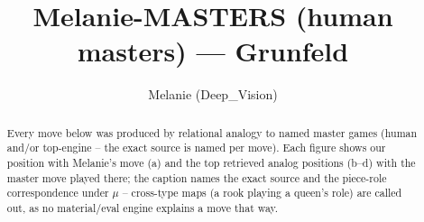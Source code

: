 \documentclass[11pt]{article}
\title{Melanie-MASTERS (human masters) — Grunfeld}
\author{Melanie (Deep\_Vision)}
\date{}
\begin{document}
\maketitle

\begin{abstract}Every move below was produced by relational analogy to named master games (human and/or top-engine -- the exact source is named per move). Each figure shows our position with Melanie's move (a) and the top retrieved analog positions (b--d) with the master move played there; the caption names the exact source and the piece-role correspondence under $\mu$ -- cross-type maps (a rook playing a queen's role) are called out, as no material/eval engine explains a move that way.\end{abstract}

\begin{figure}[p]\centering
\begin{subfigure}{0.46\textwidth}\centering
\resizebox{\linewidth}{!}{%
\newchessgame
\chessboard[
  setfen={rnbqk2r/ppp1ppbp/6p1/8/2BPP3/2P5/P4PPP/R1BQK1NR b KQkq - 2 7},
  showmover=false,
  pgfstyle=straightmove, color=movearrow, markmove={g7-f6}
]}
\caption{}
\end{subfigure}\hfill
\begin{subfigure}{0.46\textwidth}\centering
\resizebox{\linewidth}{!}{%
\newchessgame
\chessboard[
  setfen={r1bqk2r/pp3ppp/8/2bpP3/2p5/8/PPP1BPPP/R1BQ1RK1 w kq - 1 12},
  showmover=false,
  pgfstyle=straightmove, color=movearrow, markmove={e2-f3}
]}
\caption{}
\end{subfigure}
\\[4pt]
\begin{subfigure}{0.46\textwidth}\centering
\resizebox{\linewidth}{!}{%
\newchessgame
\chessboard[
  setfen={r2qk2r/pppn1pp1/2p3p1/2b5/4P1P1/3P3P/PPP2P2/RNBQ1RK1 w kq - 0 11},
  showmover=false,
  pgfstyle=straightmove, color=movearrow, markmove={d1-f3}
]}
\caption{}
\end{subfigure}\hfill
\begin{subfigure}{0.46\textwidth}\centering
\resizebox{\linewidth}{!}{%
\newchessgame
\chessboard[
  setfen={rnbqk2r/p3pp1p/6p1/1NpPb3/2B4P/8/PP3PP1/R1BQK2R b KQkq - 0 11},
  showmover=false,
  pgfstyle=straightmove, color=movearrow, markmove={c8-a6}
]}
\caption{}
\end{subfigure}

\end{figure}
\end{document}
